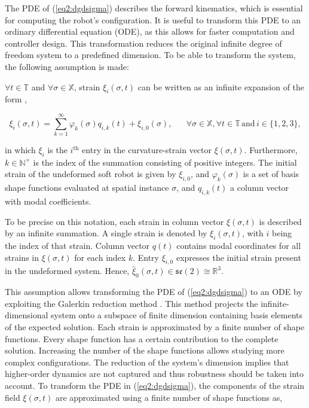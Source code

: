 The PDE of (\ref{eq2:dgdsigma}) describes the forward kinematics, which is essential for computing the robot's configuration. It is useful to transform this PDE to an ordinary differential equation (ODE), as this allows for faster computation and controller design. This transformation reduces the original infinite degree of freedom system to a predefined dimension. To be able to transform the system, the following assumption is made: 

\begin{theorem}

$\forall t \in \mathbb{T}$ and $\forall \sigma \in \mathbb{X}$, strain $\xi_i(\sigma,t)$ can be written as an infinite expansion of the form \cite{Caasenbrood2020},

\begin{equation}
\xi_i(\sigma,t) = \sum_{k=1}^\infty \varphi_k(\sigma)q_{i,k}(t) + \xi_{i,0}(\sigma), \hspace{20pt} \forall \sigma \in \mathbb{X}, \forall t \in \mathbb{T} \hspace{2pt} \text{and} \hspace{2pt} i \in \{1,2,3\},
\label{eq2:strainexact}
\end{equation}

in which $\xi_{i}$ is the $i^{\text{th}}$ entry in the curvature-strain vector $\xi(\sigma,t)$. Furthermore, $k \in \mathbb{N}^+$ is the index of the summation consisting of positive integers. The initial strain of the undeformed soft robot is given by $\xi_{i,0}$, and $\varphi_k(\sigma)$ is a set of basis shape functions evaluated at spatial instance $\sigma$, and $q_{i,k}(t)$ a column vector with modal coefficients. 
\end{theorem}

To be precise on this notation, each strain in column vector $\xi(\sigma,t)$ is described by an infinite summation. A single strain is denoted by $\xi_i(\sigma,t)$, with $i$ being the index of that strain. Column vector $q(t)$ contains modal coordinates for all strains in $\xi(\sigma,t)$ for each index $k$. Entry $\xi_{i,0}$ expresses the initial strain present in the undeformed system. Hence, $\hat{\xi}_0(\sigma,t) \in \mathfrak{se}(2) \cong \mathbb{R}^3$. 

This assumption allows transforming the PDE of (\ref{eq2:dgdsigma}) to an ODE by exploiting the Galerkin reduction method \cite{Galerkin}. This method projects the infinite-dimensional system onto a subspace of finite dimension containing basis elements of the expected solution. Each strain is approximated by a finite number of shape functions. Every shape function has a certain contribution to the complete solution. Increasing the number of the shape functions allows studying more complex configurations. The reduction of the system's dimension implies that higher-order dynamics are not captured and thus robustness should be taken into account. To transform the PDE in (\ref{eq2:dgdsigma}), the components of the strain field $\xi(\sigma,t)$ are approximated using a finite number of shape functions as,

